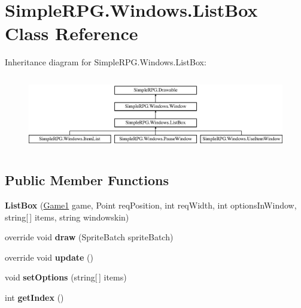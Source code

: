 \hypertarget{class_simple_r_p_g_1_1_windows_1_1_list_box}{\section{Simple\+R\+P\+G.\+Windows.\+List\+Box Class Reference}
\label{class_simple_r_p_g_1_1_windows_1_1_list_box}
}
Inheritance diagram for Simple\+R\+P\+G.\+Windows.\+List\+Box\+:\begin{figure}[H]
\begin{center}
\leavevmode
\includegraphics[height=3.289281cm]{class_simple_r_p_g_1_1_windows_1_1_list_box}
\end{center}
\end{figure}
\subsection*{Public Member Functions}
\begin{DoxyCompactItemize}
\item 
\hypertarget{class_simple_r_p_g_1_1_windows_1_1_list_box_adb75959fbbfaad12d00d92ea25df02fd}{{\bfseries List\+Box} (\hyperlink{class_simple_r_p_g_1_1_game1}{Game1} game, Point req\+Position, int req\+Width, int options\+In\+Window, string\mbox{[}$\,$\mbox{]} items, string windowskin)}\label{class_simple_r_p_g_1_1_windows_1_1_list_box_adb75959fbbfaad12d00d92ea25df02fd}

\item 
\hypertarget{class_simple_r_p_g_1_1_windows_1_1_list_box_a9554b0fc0656571c97d4b633dd63f4c0}{override void {\bfseries draw} (Sprite\+Batch sprite\+Batch)}\label{class_simple_r_p_g_1_1_windows_1_1_list_box_a9554b0fc0656571c97d4b633dd63f4c0}

\item 
\hypertarget{class_simple_r_p_g_1_1_windows_1_1_list_box_ae061189951387436b8d0edc90e667330}{override void {\bfseries update} ()}\label{class_simple_r_p_g_1_1_windows_1_1_list_box_ae061189951387436b8d0edc90e667330}

\item 
\hypertarget{class_simple_r_p_g_1_1_windows_1_1_list_box_a3b6d40c01a1c816fc7e72aea2e6d328a}{void {\bfseries set\+Options} (string\mbox{[}$\,$\mbox{]} items)}\label{class_simple_r_p_g_1_1_windows_1_1_list_box_a3b6d40c01a1c816fc7e72aea2e6d328a}

\item 
\hypertarget{class_simple_r_p_g_1_1_windows_1_1_list_box_a4abd9037503be834ae7a194bd1449999}{int {\bfseries get\+Index} ()}\label{class_simple_r_p_g_1_1_windows_1_1_list_box_a4abd9037503be834ae7a194bd1449999}

\end{DoxyCompactItemize}
